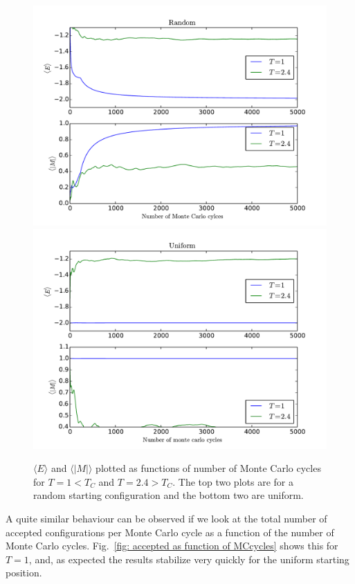 \documentclass[twoside, 11pt]{article}
\begin{document}
		
		\begin{figure}
			\centering
			\includegraphics[scale=0.7]{../Results/task_c/task_c_averages_random.pdf}
			\includegraphics[scale=0.7]{../Results/task_c/task_c_averages_uniform.pdf}
			\caption{$\langle E \rangle$ and $\langle |M| \rangle$ plotted as functions of number of Monte Carlo cycles for $T=1<T_C$ and $T=2.4>T_C$. The top two plots are for a random starting configuration and the bottom two are uniform.}
			\label{fig: expectation values as functions of MCcycles}
		\end{figure}
		
		A quite similar behaviour can be observed if we look at the total number of accepted configurations per Monte Carlo cycle as a function of the number of Monte Carlo cycles. Fig.~\ref{fig: accepted as function of MCcycles} shows this for $T=1$, and, as expected the results stabilize very quickly for the uniform starting position. 
		
\end{document}
